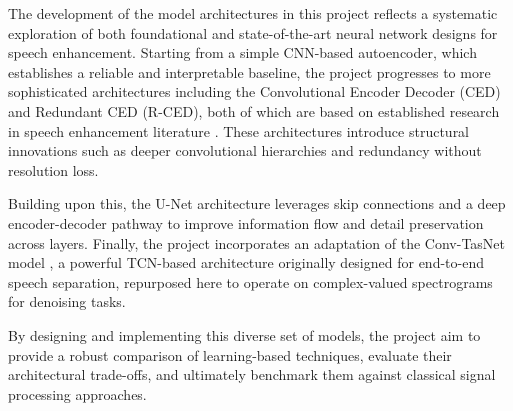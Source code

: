 The development of the model architectures in this project reflects a systematic exploration of both foundational and state-of-the-art neural network designs for speech enhancement. Starting from a simple CNN-based autoencoder, which establishes a reliable and interpretable baseline, the project progresses to more sophisticated architectures including the Convolutional Encoder Decoder (CED) and Redundant CED (R-CED), both of which are based on established research in speech enhancement literature \cite{park2017acoustic}. These architectures introduce structural innovations such as deeper convolutional hierarchies and redundancy without resolution loss.

Building upon this, the U-Net architecture leverages skip connections and a deep encoder-decoder pathway to improve information flow and detail preservation across layers. Finally, the project incorporates an adaptation of the Conv-TasNet model \cite{luo2019conv}, a powerful TCN-based architecture originally designed for end-to-end speech separation, repurposed here to operate on complex-valued spectrograms for denoising tasks.

By designing and implementing this diverse set of models, the project aim to provide a robust comparison of learning-based techniques, evaluate their architectural trade-offs, and ultimately benchmark them against classical signal processing approaches.



